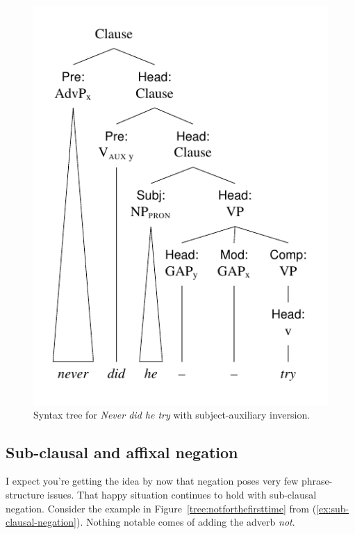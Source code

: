 \begin{figure}
    \centering
    \includegraphics{figures/neverdidhe.pdf}
    \caption{Syntax tree for \textit{Never did he try} with subject-auxiliary inversion.}
    \label{tree:neverdidhe}
\end{figure}

\subsection{Sub-clausal and affixal negation}

I expect you're getting the idea by now that negation poses very few phrase-structure issues. That happy situation continues to hold with sub-clausal negation. Consider the example in Figure~\ref{tree:notforthefirsttime} from (\ref{ex:sub-clausal-negation}). Nothing notable comes of adding the adverb \textit{not}.

